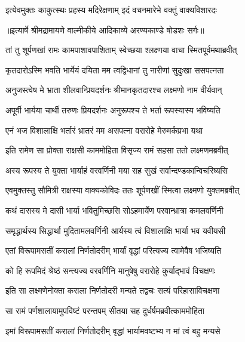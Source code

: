 \twolineshloka
{इत्येवमुक्तः काकुत्स्थः प्रहस्य मदिरेक्षणाम्}
{इदं वचनमारेभे वक्तुं वाक्यविशारदः} %


{॥इत्यार्षे श्रीमद्रामायणे वाल्मीकीये आदिकाव्ये अरण्यकाण्डे षोडशः सर्गः॥}


\twolineshloka
{तां तु शूर्पणखां रामः कामपाशावपाशिताम्}
{स्वेच्छया श्लक्ष्णया वाचा स्मितपूर्वमथाब्रवीत्} %

\twolineshloka
{कृतदारोऽस्मि भवति भार्येयं दयिता मम}
{त्वद्विधानां तु नारीणां सुदुःखा ससपत्नता} %

\twolineshloka
{अनुजस्त्वेष मे भ्राता शीलवान्प्रियदर्शनः}
{श्रीमानकृतदारश्च लक्ष्मणो नाम वीर्यवान्} %

\twolineshloka
{अपूर्वी भार्यया चार्थी तरुणः प्रियदर्शनः}
{अनुरूपश्च ते भर्ता रूपस्यास्य भविष्यति} %

\twolineshloka
{एनं भज विशालाक्षि भर्तारं भ्रातरं मम}
{असपत्ना वरारोहे मेरुमर्कप्रभा यथा} %

\twolineshloka
{इति रामेण सा प्रोक्ता राक्षसी काममोहिता}
{विसृज्य रामं सहसा ततो लक्ष्मणमब्रवीत्} %

\twolineshloka
{अस्य रूपस्य ते युक्ता भार्याहं वरवर्णिनी}
{मया सह सुखं सर्वान्दण्डकान्विचरिष्यसि} %

\twolineshloka
{एवमुक्तस्तु सौमित्री राक्षस्या वाक्यकोविदः}
{ततः शूर्पणखीं स्मित्वा लक्ष्मणो युक्तमब्रवीत्} %

\twolineshloka
{कथं दासस्य मे दासी भार्या भवितुमिच्छसि}
{सोऽहमार्येण परवान्भ्रात्रा कमलवर्णिनी} %

\twolineshloka
{समृद्धार्थस्य सिद्धार्था मुदितामलवर्णिनी}
{आर्यस्य त्वं विशालाक्षि भार्या भव यवीयसी} %

\twolineshloka
{एतां विरूपामसतीं करालां निर्णतोदरीम्}
{भार्यां वृद्धां परित्यज्य त्वामेवैष भजिष्यति} %

\twolineshloka
{को हि रूपमिदं श्रेष्ठं सन्त्यज्य वरवर्णिनि}
{मानुषेषु वरारोहे कुर्याद्भावं विचक्षणः} %

\twolineshloka
{इति सा लक्ष्मणेनोक्ता कराला निर्णतोदरी}
{मन्यते तद्वचः सत्यं परिहासाविचक्षणा} %

\twolineshloka
{सा रामं पर्णशालायामुपविष्टं परन्तपम्}
{सीतया सह दुर्धर्षमब्रवीत्काममोहिता} %

\twolineshloka
{इमां विरूपामसतीं करालां निर्णतोदरीम्}
{वृद्धां भार्यामवष्टभ्य न मां त्वं बहु मन्यसे} %

